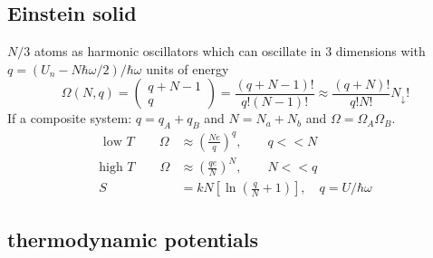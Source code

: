 \documentclass[a4paper, norsk, 8pt]{article}
\begin{document}
\begin{multicols*}{3}
\subsection*{\footnotesize  Einstein solid}
$N/3$ atoms as harmonic oscillators which can oscillate in $3$ dimensions with $q=(U_n-N\hbar\omega/2)/\hbar\omega$ units of energy
\begin{equation}
  \Omega(N, q) = \begin{pmatrix} q+N-1 \\ q \end{pmatrix} = \frac{(q+N-1)!}{q! (N-1)!} \approx  \frac{(q+N)!}{q! N!} N_{\downarrow}!
\end{equation}
If a composite system: $q=q_A+q_B$ and $N=N_a+N_b$ and $\Omega = \Omega_A\Omega_B$.
\begin{align*}
  \text{ low $T$}\qquad \Omega &\approx \left(\frac{Ne}{q} \right)^q,  \qquad q << N\\
  \text{high $T$}\qquad \Omega &\approx \left(\frac{qe}{N} \right)^N,  \qquad N << q \\
  S &= kN\left[ \ln{\left( \frac{q}{N} + 1\right)} \right],\quad q = U/\hbar\omega
\end{align*}

\subsection*{\footnotesize  thermodynamic potentials}


\end{multicols*}
\end{document}
